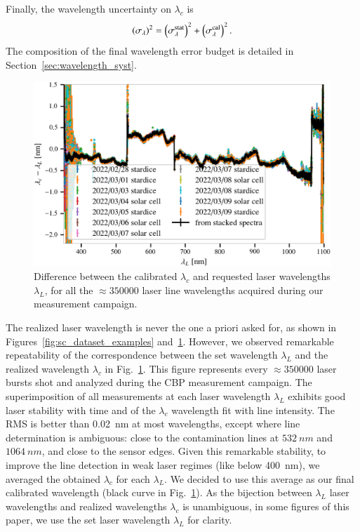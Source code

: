 Finally, the wavelength uncertainty on $\lambda_c$ is
\begin{equation}
  \left(\sigma_{\lambda}\right)^2 =  \left(\sigma_{\lambda}^{\rm stat}\right)^2 +  \left(\sigma_{\lambda}^{\rm cal}\right)^2.   
\end{equation}
The composition of the final wavelength error budget is detailed in Section~\ref{sec:wavelength_syst}.


\begin{figure}%
\centering
\includegraphics[width=\columnwidth]{fig/wavelength_stability.png}
\caption{Difference between the calibrated $\lambda_c$ and requested laser wavelengths $\lambda_L$, for all the $\approx \num{350000}$ laser line wavelengths acquired during our measurement campaign.}\label{fig:wavelength_stability}
\end{figure}


The realized laser wavelength is never the one a priori asked for, as shown in Figures~\ref{fig:sc_dataset_examples} and~\ref{fig:wavelength_stability}. However, we observed remarkable repeatability of the correspondence between the set wavelength $\lambda_L$ and the realized wavelength $\lambda_c$ in Fig.~\ref{fig:wavelength_stability}. This figure represents every $\approx\num{350000}$ laser bursts shot and analyzed during the CBP measurement campaign. The superimposition of all measurements at each laser wavelength $\lambda_L$ exhibits good laser stability with time and of the $\lambda_c$ wavelength fit with line intensity. The RMS is better than \SI{0.02}{\nm} at most wavelengths, except where line determination is ambiguous: close to the contamination lines at $\SI{532}{nm}$ and $\SI{1064}{nm}$, and close to the sensor edges. Given this remarkable stability, to improve the line detection in weak laser regimes (like below \SI{400}{\nm}), we averaged the obtained $\lambda_c$ for each $\lambda_L$. We decided to use this average as our final calibrated wavelength (black curve in Fig.~\ref{fig:wavelength_stability}). As the bijection between $\lambda_L$ laser wavelengths and realized wavelengths $\lambda_c$ is unambiguous, in some figures of this paper, we use the set laser wavelength $\lambda_L$ for clarity. 





